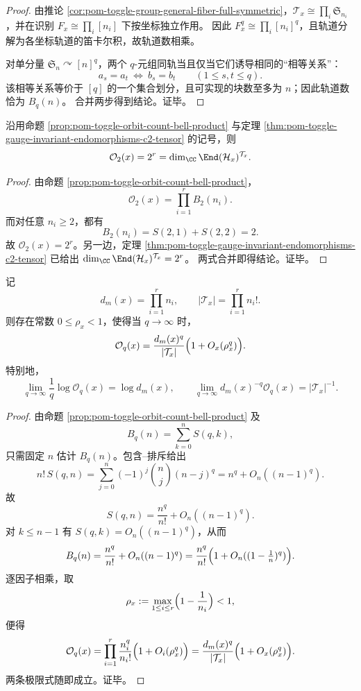 \begin{proof}
由推论 \ref{cor:pom-toggle-group-general-fiber-full-symmetric}，\(\mathcal T_x\cong \prod_i \mathfrak S_{n_i}\)，并在识别 \(F_x\cong \prod_i [n_i]\) 下按坐标独立作用。
因此 \(F_x^q\cong \prod_i [n_i]^q\)，且轨道分解为各坐标轨道的笛卡尔积，故轨道数相乘。
\par
对单分量 \(\mathfrak S_n\curvearrowright [n]^q\)，两个 \(q\)-元组同轨当且仅当它们诱导相同的“相等关系”：
\[
a_s=a_t\ \Longleftrightarrow\ b_s=b_t\qquad(1\le s,t\le q).
\]
该相等关系等价于 \([q]\) 的一个集合划分，且可实现的块数至多为 \(n\)；因此轨道数恰为 \(B_q(n)\)。
合并两步得到结论。证毕。
\end{proof}

\begin{corollary}[二重轨道与交换子代数维数的严格同一]\label{cor:pom-toggle-orbit-count-commutant-identity}
沿用命题 \ref{prop:pom-toggle-orbit-count-bell-product} 与定理 \ref{thm:pom-toggle-gauge-invariant-endomorphisms-c2-tensor} 的记号，则
\[
\mathcal O_2(x)=2^r=\dim_{\CC}\End(\mathcal H_x)^{\mathcal T_x}.
\]
\end{corollary}

\begin{proof}
由命题 \ref{prop:pom-toggle-orbit-count-bell-product}，
\[
\mathcal O_2(x)=\prod_{i=1}^r B_2(n_i).
\]
而对任意 \(n_i\ge 2\)，都有
\[
B_2(n_i)=S(2,1)+S(2,2)=2.
\]
故 \(\mathcal O_2(x)=2^r\)。另一边，定理 \ref{thm:pom-toggle-gauge-invariant-endomorphisms-c2-tensor} 已给出
\(
\dim_{\CC}\End(\mathcal H_x)^{\mathcal T_x}=2^r
\)。
两式合并即得结论。证毕。
\end{proof}

\begin{theorem}\label{thm:pom-toggle-orbit-count-asymptotic-volume-group}
记
\[
d_m(x)=\prod_{i=1}^r n_i,
\qquad
|\mathcal T_x|=\prod_{i=1}^r n_i!.
\]
则存在常数 \(0\le \rho_x<1\)，使得当 \(q\to\infty\) 时，
\[
\mathcal O_q(x)
=
\frac{d_m(x)^q}{|\mathcal T_x|}
\Bigl(1+O_x(\rho_x^q)\Bigr).
\]
特别地，
\[
\lim_{q\to\infty}\frac1q\log \mathcal O_q(x)=\log d_m(x),
\qquad
\lim_{q\to\infty} d_m(x)^{-q}\mathcal O_q(x)=|\mathcal T_x|^{-1}.
\]
\end{theorem}

\begin{proof}
由命题 \ref{prop:pom-toggle-orbit-count-bell-product} 及
\[
B_q(n)=\sum_{k=0}^{n}S(q,k),
\]
只需固定 \(n\) 估计 \(B_q(n)\)。包含--排斥给出
\[
n!\,S(q,n)=\sum_{j=0}^{n}(-1)^j\binom{n}{j}(n-j)^q
=n^q+O_n((n-1)^q).
\]
故
\[
S(q,n)=\frac{n^q}{n!}+O_n((n-1)^q).
\]
对 \(k\le n-1\) 有 \(S(q,k)=O_n((n-1)^q)\)，从而
\[
B_q(n)
=
\frac{n^q}{n!}+O_n((n-1)^q)
=
\frac{n^q}{n!}\Bigl(1+O_n((1-\tfrac1n)^q)\Bigr).
\]
逐因子相乘，取
\[
\rho_x:=\max_{1\le i\le r}\Bigl(1-\frac1{n_i}\Bigr)<1,
\]
便得
\[
\mathcal O_q(x)
=
\prod_{i=1}^r\frac{n_i^q}{n_i!}\Bigl(1+O_i(\rho_x^q)\Bigr)
=
\frac{d_m(x)^q}{|\mathcal T_x|}\Bigl(1+O_x(\rho_x^q)\Bigr).
\]
两条极限式随即成立。证毕。
\end{proof}

